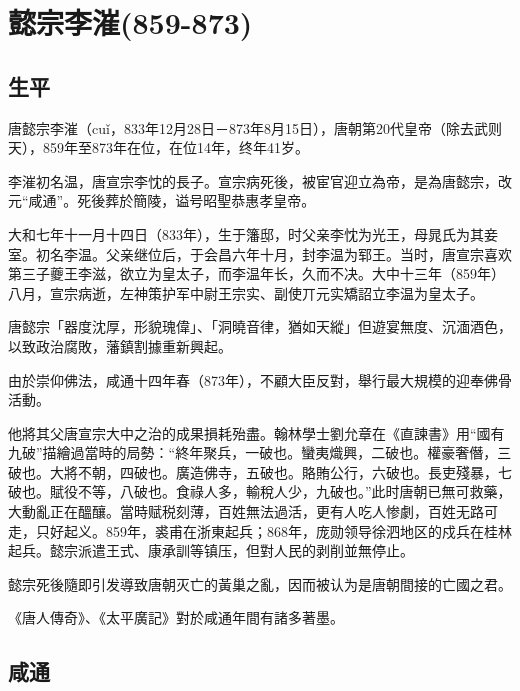 
\section{懿宗李漼\tiny(859-873)}

\subsection{生平}

唐懿宗李漼（cuǐ，833年12月28日－873年8月15日），唐朝第20代皇帝（除去武则天），859年至873年在位，在位14年，终年41岁。

李漼初名温，唐宣宗李忱的長子。宣宗病死後，被宦官迎立為帝，是為唐懿宗，改元“咸通”。死後葬於簡陵，谥号昭聖恭惠孝皇帝。

大和七年十一月十四日（833年），生于籓邸，时父亲李忱为光王，母晁氏为其妾室。初名李温。父亲继位后，于会昌六年十月，封李温为郓王。当时，唐宣宗喜欢第三子夔王李滋，欲立为皇太子，而李温年长，久而不决。大中十三年（859年）八月，宣宗病逝，左神策护军中尉王宗实、副使丌元实矯詔立李温为皇太子。

唐懿宗「器度沈厚，形貌瑰偉」、「洞曉音律，猶如天縱」但遊宴無度、沉湎酒色，以致政治腐敗，藩鎮割據重新興起。

由於崇仰佛法，咸通十四年春（873年），不顧大臣反對，舉行最大規模的迎奉佛骨活動。

他將其父唐宣宗大中之治的成果損耗殆盡。翰林學士劉允章在《直諫書》用“國有九破”描繪過當時的局勢：“終年聚兵，一破也。蠻夷熾興，二破也。權豪奢僭，三破也。大將不朝，四破也。廣造佛寺，五破也。賂賄公行，六破也。長吏殘暴，七破也。賦役不等，八破也。食祿人多，輸稅人少，九破也。”此时唐朝已無可救藥，大動亂正在醞釀。當時赋税刻薄，百姓無法過活，更有人吃人惨劇，百姓无路可走，只好起义。859年，裘甫在浙東起兵；868年，庞勋领导徐泗地区的戍兵在桂林起兵。懿宗派遣王式、康承訓等镇压，但對人民的剥削並無停止。

懿宗死後隨即引发導致唐朝灭亡的黃巢之亂，因而被认为是唐朝間接的亡國之君。

《唐人傳奇》、《太平廣記》對於咸通年間有諸多著墨。

\subsection{咸通}

